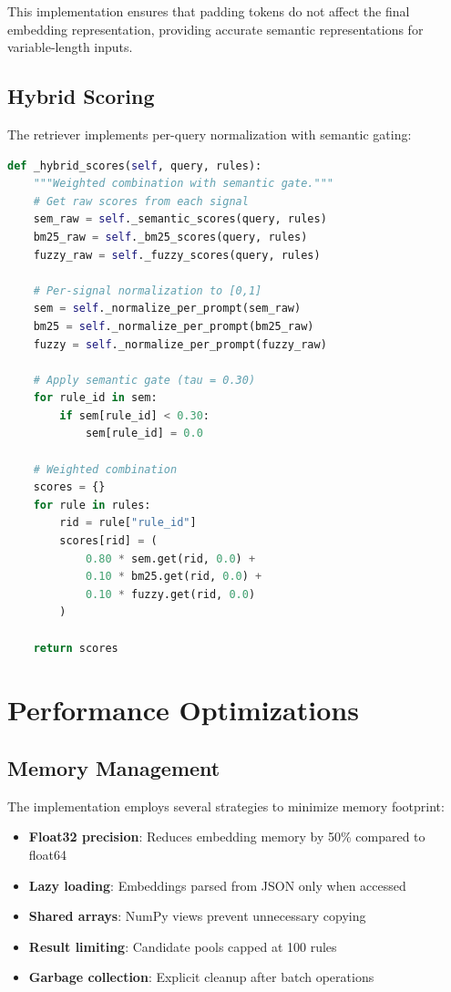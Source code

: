 This implementation ensures that padding tokens do not affect the final embedding representation, providing accurate semantic representations for variable-length inputs.

\subsection{Hybrid Scoring}

The retriever implements per-query normalization with semantic gating:

\begin{lstlisting}[language=Python, caption={Hybrid score computation with semantic gate}, label={lst:hybrid-scoring}]
def _hybrid_scores(self, query, rules):
    """Weighted combination with semantic gate."""
    # Get raw scores from each signal
    sem_raw = self._semantic_scores(query, rules)
    bm25_raw = self._bm25_scores(query, rules)
    fuzzy_raw = self._fuzzy_scores(query, rules)
    
    # Per-signal normalization to [0,1]
    sem = self._normalize_per_prompt(sem_raw)
    bm25 = self._normalize_per_prompt(bm25_raw)
    fuzzy = self._normalize_per_prompt(fuzzy_raw)
    
    # Apply semantic gate (tau = 0.30)
    for rule_id in sem:
        if sem[rule_id] < 0.30:
            sem[rule_id] = 0.0
    
    # Weighted combination
    scores = {}
    for rule in rules:
        rid = rule["rule_id"]
        scores[rid] = (
            0.80 * sem.get(rid, 0.0) +
            0.10 * bm25.get(rid, 0.0) +
            0.10 * fuzzy.get(rid, 0.0)
        )
    
    return scores
\end{lstlisting}

\section{Performance Optimizations}

\subsection{Memory Management}

The implementation employs several strategies to minimize memory footprint:

\begin{itemize}[leftmargin=*,itemsep=3pt,topsep=3pt]
  \item \textbf{Float32 precision}: Reduces embedding memory by 50\% compared to float64
  \item \textbf{Lazy loading}: Embeddings parsed from JSON only when accessed
  \item \textbf{Shared arrays}: NumPy views prevent unnecessary copying
  \item \textbf{Result limiting}: Candidate pools capped at 100 rules
  \item \textbf{Garbage collection}: Explicit cleanup after batch operations
\end{itemize}

